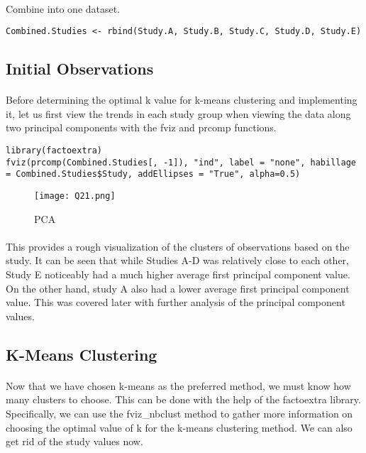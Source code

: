 \documentclass{article}
\begin{document}
\paragraph{}Combine into one dataset.
\begin{lstlisting}
Combined.Studies <- rbind(Study.A, Study.B, Study.C, Study.D, Study.E)
\end{lstlisting}
	\subsection{Initial Observations}
	\paragraph{} Before determining the optimal k value for k-means clustering and implementing it, let us first view the trends in each study group when viewing the data along two principal components with the fviz and prcomp functions.

\begin{lstlisting}
library(factoextra)
fviz(prcomp(Combined.Studies[, -1]), "ind", label = "none", habillage = Combined.Studies$Study, addEllipses = "True", alpha=0.5)
\end{lstlisting}
	
	\begin{figure}[H]
		\centering
		\texttt{[image: Q21.png]}
		\caption{PCA}
	\end{figure}
	\paragraph{}This provides a rough visualization of the clusters of observations based on the study. It can be seen that while Studies A-D was relatively close to each other, Study E noticeably had a much higher average first principal component value. On the other hand, study A also had a lower average first principal component value. This was covered later with further analysis of the principal component values.


	\subsection{K-Means Clustering}
	\paragraph{} Now that we have chosen k-means as the preferred method, we must know how many clusters to choose. This can be done with the help of the factoextra library. Specifically, we can use the fviz_nbclust method to gather more information on choosing the optimal value of k for the k-means clustering method. We can also get rid of the study values now.
	
\end{document}
